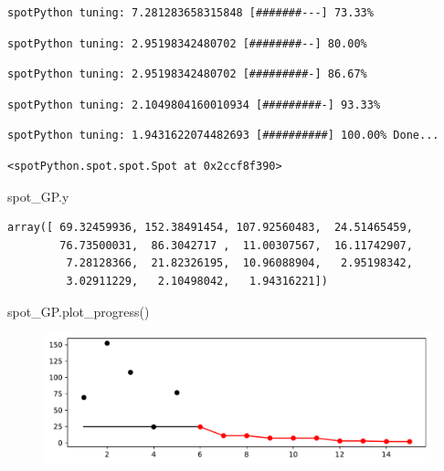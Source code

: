 \documentclass[
  letterpaper,
  DIV=11,
  numbers=noendperiod]{scrreprt}
\newenvironment{Shaded}{\begin{snugshade}}{\end{snugshade}}
\newcommand{\NormalTok}[1]{\textcolor[rgb]{0.00,0.23,0.31}{#1}}
\begin{document}
\begin{verbatim}
spotPython tuning: 7.281283658315848 [#######---] 73.33% 
\end{verbatim}

\begin{verbatim}
spotPython tuning: 2.95198342480702 [########--] 80.00% 
\end{verbatim}

\begin{verbatim}
spotPython tuning: 2.95198342480702 [#########-] 86.67% 
\end{verbatim}

\begin{verbatim}
spotPython tuning: 2.1049804160010934 [#########-] 93.33% 
\end{verbatim}

\begin{verbatim}
spotPython tuning: 1.9431622074482693 [##########] 100.00% Done...
\end{verbatim}

\begin{verbatim}
<spotPython.spot.spot.Spot at 0x2ccf8f390>
\end{verbatim}

\begin{Shaded}
\begin{Highlighting}[]
\NormalTok{spot\_GP.y}
\end{Highlighting}
\end{Shaded}

\begin{verbatim}
array([ 69.32459936, 152.38491454, 107.92560483,  24.51465459,
        76.73500031,  86.3042717 ,  11.00307567,  16.11742907,
         7.28128366,  21.82326195,  10.96088904,   2.95198342,
         3.02911229,   2.10498042,   1.94316221])
\end{verbatim}

\begin{Shaded}
\begin{Highlighting}[]
\NormalTok{spot\_GP.plot\_progress()}
\end{Highlighting}
\end{Shaded}

\begin{figure}[H]

{\centering \includegraphics{012_num_spot_ei_files/figure-pdf/cell-35-output-1.pdf}

}

\end{figure}
\end{document}
